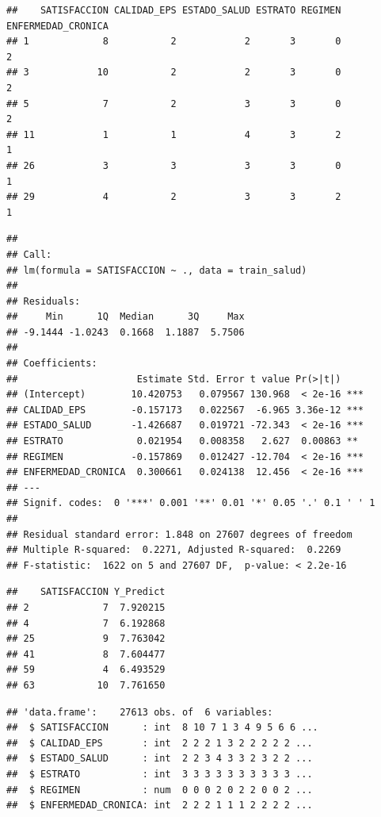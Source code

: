 \documentclass[
]{article}
\begin{document}
\begin{verbatim}
##    SATISFACCION CALIDAD_EPS ESTADO_SALUD ESTRATO REGIMEN ENFERMEDAD_CRONICA
## 1             8           2            2       3       0                  2
## 3            10           2            2       3       0                  2
## 5             7           2            3       3       0                  2
## 11            1           1            4       3       2                  1
## 26            3           3            3       3       0                  1
## 29            4           2            3       3       2                  1
\end{verbatim}

\begin{verbatim}
## 
## Call:
## lm(formula = SATISFACCION ~ ., data = train_salud)
## 
## Residuals:
##     Min      1Q  Median      3Q     Max 
## -9.1444 -1.0243  0.1668  1.1887  5.7506 
## 
## Coefficients:
##                     Estimate Std. Error t value Pr(>|t|)    
## (Intercept)        10.420753   0.079567 130.968  < 2e-16 ***
## CALIDAD_EPS        -0.157173   0.022567  -6.965 3.36e-12 ***
## ESTADO_SALUD       -1.426687   0.019721 -72.343  < 2e-16 ***
## ESTRATO             0.021954   0.008358   2.627  0.00863 ** 
## REGIMEN            -0.157869   0.012427 -12.704  < 2e-16 ***
## ENFERMEDAD_CRONICA  0.300661   0.024138  12.456  < 2e-16 ***
## ---
## Signif. codes:  0 '***' 0.001 '**' 0.01 '*' 0.05 '.' 0.1 ' ' 1
## 
## Residual standard error: 1.848 on 27607 degrees of freedom
## Multiple R-squared:  0.2271, Adjusted R-squared:  0.2269 
## F-statistic:  1622 on 5 and 27607 DF,  p-value: < 2.2e-16
\end{verbatim}

\begin{verbatim}
##    SATISFACCION Y_Predict
## 2             7  7.920215
## 4             7  6.192868
## 25            9  7.763042
## 41            8  7.604477
## 59            4  6.493529
## 63           10  7.761650
\end{verbatim}

\begin{verbatim}
## 'data.frame':    27613 obs. of  6 variables:
##  $ SATISFACCION      : int  8 10 7 1 3 4 9 5 6 6 ...
##  $ CALIDAD_EPS       : int  2 2 2 1 3 2 2 2 2 2 ...
##  $ ESTADO_SALUD      : int  2 2 3 4 3 3 2 3 2 2 ...
##  $ ESTRATO           : int  3 3 3 3 3 3 3 3 3 3 ...
##  $ REGIMEN           : num  0 0 0 2 0 2 2 0 0 2 ...
##  $ ENFERMEDAD_CRONICA: int  2 2 2 1 1 1 2 2 2 2 ...
\end{verbatim}
\end{document}
